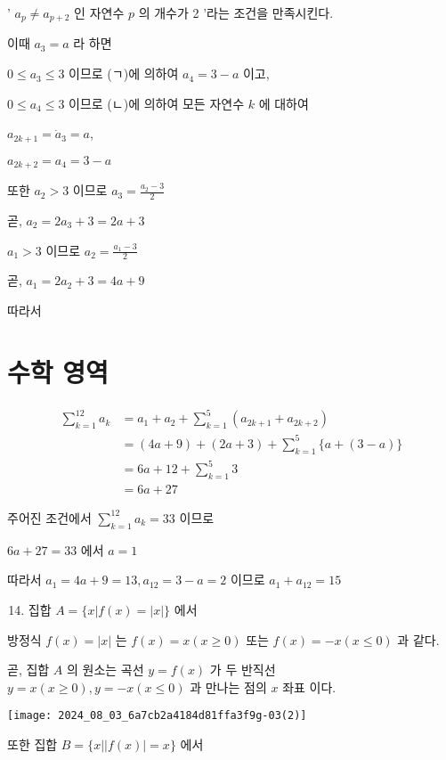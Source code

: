 \documentclass[10pt]{article}
\begin{document}
' \(a_{p} \neq a_{p+2}\) 인 자연수 \(p\) 의 개수가 2 '라는 조건을 만족시킨다.

이때 \(a_{3}=a\) 라 하면

\(0 \leq a_{3} \leq 3\) 이므로 (ㄱ)에 의하여 \(a_{4}=3-a\) 이고,

\(0 \leq a_{4} \leq 3\) 이므로 (ㄴ)에 의하여 모든 자연수 \(k\) 에 대하여

\(a_{2 k+1}=\dot{a}_{3}=a\),

\(a_{2 k+2}=a_{4}=3-a\)

또한 \(a_{2}>3\) 이므로 \(a_{3}=\frac{a_{2}-3}{2}\)

곧, \(a_{2}=2 a_{3}+3=2 a+3\)

\(a_{1}>3\) 이므로 \(a_{2}=\frac{a_{1}-3}{2}\)

곧, \(a_{1}=2 a_{2}+3=4 a+9\)

따라서

\section*{수학 영역}
\[
\begin{aligned}
\sum_{k=1}^{12} a_{k} & =a_{1}+a_{2}+\sum_{k=1}^{5}\left(a_{2 k+1}+a_{2 k+2}\right) \\
& =(4 a+9)+(2 a+3)+\sum_{k=1}^{5}\{a+(3-a)\} \\
& =6 a+12+\sum_{k=1}^{5} 3 \\
& =6 a+27
\end{aligned}
\]

주어진 조건에서 \(\sum_{k=1}^{12} a_{k}=33\) 이므로

\(6 a+27=33\) 에서 \(a=1\)

따라서 \(a_{1}=4 a+9=13, a_{12}=3-a=2\) 이므로 \(a_{1}+a_{12}=15\)

\begin{enumerate}
  \setcounter{enumi}{13}
  \item 집합 \(A=\{x|f(x)=| x \mid\}\) 에서
\end{enumerate}

방정식 \(f(x)=|x|\) 는 \(f(x)=x(x \geq 0)\) 또는 \(f(x)=-x(x \leq 0)\) 과 같다.

곧, 집합 \(A\) 의 원소는 곡선 \(y=f(x)\) 가 두 반직선 \(y=x(x \geq 0), y=-x(x \leq 0)\) 과 만나는 점의 \(x\) 좌표 이다.

\begin{center}
\texttt{[image: 2024\_08\_03\_6a7cb2a4184d81ffa3f9g-03(2)]}
\end{center}

또한 집합 \(B=\{x|| f(x) \mid=x\}\) 에서
\end{document}
